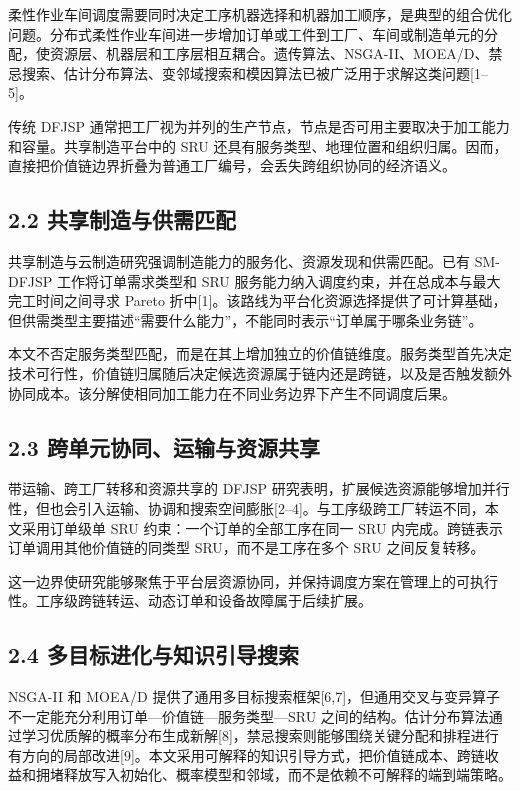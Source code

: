 \documentclass[UTF8,11pt]{ctexart}
\begin{document}
柔性作业车间调度需要同时决定工序机器选择和机器加工顺序，是典型的组合优化问题。分布式柔性作业车间进一步增加订单或工件到工厂、车间或制造单元的分配，使资源层、机器层和工序层相互耦合。遗传算法、NSGA-II、MOEA/D、禁忌搜索、估计分布算法、变邻域搜索和模因算法已被广泛用于求解这类问题[1–5]。

传统 DFJSP 通常把工厂视为并列的生产节点，节点是否可用主要取决于加工能力和容量。共享制造平台中的 SRU 还具有服务类型、地理位置和组织归属。因而，直接把价值链边界折叠为普通工厂编号，会丢失跨组织协同的经济语义。

\subsection*{2.2 共享制造与供需匹配}

共享制造与云制造研究强调制造能力的服务化、资源发现和供需匹配。已有 SM-DFJSP 工作将订单需求类型和 SRU 服务能力纳入调度约束，并在总成本与最大完工时间之间寻求 Pareto 折中[1]。该路线为平台化资源选择提供了可计算基础，但供需类型主要描述“需要什么能力”，不能同时表示“订单属于哪条业务链”。

本文不否定服务类型匹配，而是在其上增加独立的价值链维度。服务类型首先决定技术可行性，价值链归属随后决定候选资源属于链内还是跨链，以及是否触发额外协同成本。该分解使相同加工能力在不同业务边界下产生不同调度后果。

\subsection*{2.3 跨单元协同、运输与资源共享}

带运输、跨工厂转移和资源共享的 DFJSP 研究表明，扩展候选资源能够增加并行性，但也会引入运输、协调和搜索空间膨胀[2–4]。与工序级跨工厂转运不同，本文采用订单级单 SRU 约束：一个订单的全部工序在同一 SRU 内完成。跨链表示订单调用其他价值链的同类型 SRU，而不是工序在多个 SRU 之间反复转移。

这一边界使研究能够聚焦于平台层资源协同，并保持调度方案在管理上的可执行性。工序级跨链转运、动态订单和设备故障属于后续扩展。

\subsection*{2.4 多目标进化与知识引导搜索}

NSGA-II 和 MOEA/D 提供了通用多目标搜索框架[6,7]，但通用交叉与变异算子不一定能充分利用订单—价值链—服务类型—SRU 之间的结构。估计分布算法通过学习优质解的概率分布生成新解[8]，禁忌搜索则能够围绕关键分配和排程进行有方向的局部改进[9]。本文采用可解释的知识引导方式，把价值链成本、跨链收益和拥堵释放写入初始化、概率模型和邻域，而不是依赖不可解释的端到端策略。
\end{document}
